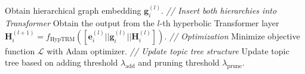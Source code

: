\begin{algorithm}
\begin{algorithmic}[1]
        \State Obtain hierarchical graph embedding $ \textbf{g}_i^{(l)} $. %
        \Statex \qquad\qquad\textit{ // Insert both hierarchies into Transformer}
        \State Obtain the output from the $ l $-th hyperbolic Transformer layer $ \textbf{H}_i^{(l+1)}=f_{\text{HypTRM}}([\textbf{e}_i^{(l)}||\textbf{g}_i^{(l)}||\textbf{H}_i^{(l)}]). $
		\EndFor
        \EndFor
        \Statex \quad\textit{ // Optimization}
		\State Minimize objective function $ \mathcal{L} $ with Adam optimizer.
		\Statex \quad\textit{ // Update topic tree structure}
		\State Update topic tree based on adding threshold $ \lambda_{\text{add}} $ and pruning threshold $ \lambda_{\text{prune}} $.
		\EndWhile
	\end{algorithmic}
\end{algorithm}

